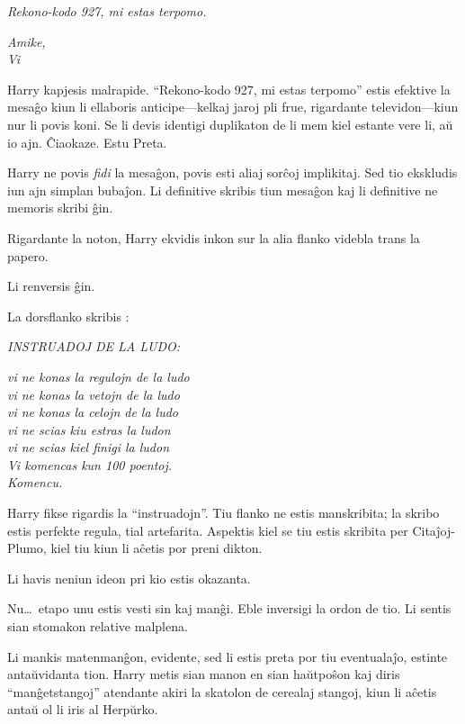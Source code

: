 \emph{Rekono-kodo 927, mi estas terpomo.}

\emph{Amike,\\
  Vi}

\medskip

Harry kapjesis malrapide. ``Rekono-kodo 927, mi estas terpomo'' estis
efektive la mesaĝo kiun li ellaboris anticipe—kelkaj jaroj pli frue,
rigardante televidon—kiun nur li povis koni. Se li devis identigi
duplikaton de li mem kiel estante vere li, aŭ io ajn. Ĉiaokaze. Estu Preta.

Harry ne povis \emph{fidi} la mesaĝon, povis esti aliaj sorĉoj
implikitaj. Sed tio ekskludis iun ajn simplan bubaĵon. Li definitive
skribis tiun mesaĝon kaj li definitive ne memoris skribi ĝin.

Rigardante la noton, Harry ekvidis inkon sur la alia flanko videbla
trans la papero.

Li renversis ĝin.

La dorsflanko skribis :
\medskip

\begin{center}
  \emph{INSTRUADOJ DE LA LUDO:}

  \emph{vi ne konas la regulojn de la ludo\\
    vi ne konas la vetojn de la ludo\\
    vi ne konas la celojn de la ludo\\
    vi ne scias kiu estras la ludon\\
    vi ne scias kiel finigi la ludon\\
    Vi komencas kun 100 poentoj.\\
    Komencu.}
\end{center}

\medskip

Harry fikse rigardis la ``instruadojn''. Tiu flanko ne estis
manskribita; la skribo estis perfekte regula, tial
artefarita. Aspektis kiel se tiu estis skribita per Citaĵoj-Plumo,
kiel tiu kiun li aĉetis por preni dikton.

Li havis neniun ideon pri kio estis okazanta.

Nu\ldots~etapo unu estis vesti sin kaj manĝi. Eble inversigi la ordon
de tio. Li sentis sian stomakon relative malplena.

Li mankis matenmanĝon, evidente, sed li estis preta por tiu eventualaĵo, estinte
antaŭvidanta tion. Harry metis sian manon en sian haŭtpoŝon kaj diris
``manĝetstangoj'' atendante akiri la skatolon de cerealaj stangoj, kiun li
aĉetis antaŭ ol li iris al Herpŭrko.

